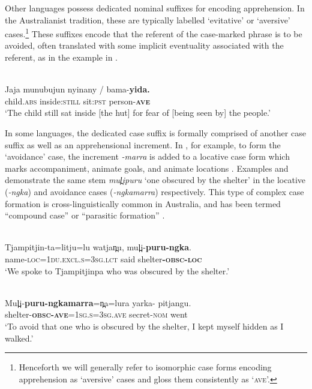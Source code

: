 \documentclass[output=paper,colorlinks,citecolor=brown]{langscibook}
\begin{document}
 Other languages possess dedicated nominal suffixes for encoding apprehension. In the Australianist tradition, these are typically labelled `evitative' or `aversive' cases.\footnote{Henceforth we will generally refer to isomorphic case forms encoding apprehension as `aversive' cases and gloss them consistently as `\textsc{ave}'.} These suffixes encode that the referent of the case-marked phrase is to be avoided, often translated with some implicit eventuality associated with the referent, as in the  example in .

\ea 
{} {\citealt[262]{dixon_grammar_1977}} \\
\gll Jaja munubujun {nyinany \textnormal{/}} bama-\textbf{yida.} \\
child.\textsc{abs} inside:\textsc{still} sit:\textsc{pst} person-\textsc{\textbf{ave}} \\
\glt `The child still sat inside [the hut] for fear of [being seen by] the people.'
\label{ex:bro4}
\z

 In some languages, the dedicated case suffix is formally comprised of another case suffix as well as an apprehensional increment. In , for example, to form the `avoidance' case, the increment \textit{-marra} is added to a locative case form which marks accompaniment, animate goals, and animate locations \citep[57]{hansen_core_1978}. Examples  and  demonstrate the same stem \textit{mul̪ipuru} `one obscured by the shelter' in the locative (\textit{-ngka}) and avoidance cases (\textit{-ngkamarra}) respectively. This type of complex case formation is cross-linguistically common in Australia, and has been termed ``compound case'' \citep[256]{schweiger_compound_2000} or ``parasitic formation'' \citep[85--86]{matthews_morphology_1991}.



\ea
{} {\citealt[99]{hansen_core_1978}} \\
\gll Tjampitjin-ta=litju=lu watja{n̪}u, mul̪i-\textbf{puru-ngka}. \\
name-\textsc{loc=1du.excl.s=3sg.lct} said shelter\textbf{-\textsc{obsc-loc}}\\
\glt `We spoke to Tjampitjinpa who was obscured by the shelter.' 
\label{ex:bro5}
\z


\ea
{} {\citealt[99]{hansen_core_1978}} \\
\gll Mul̪i-\textbf{puru-ngkamarra}=n̪a=lura {yarka-\emptyset} pitjangu. \\
shelter-\textbf{\textsc{obsc-ave}}=\textsc{1sg.s=3sg.ave} secret-\textsc{nom} went \\
\glt `To avoid that one who is obscured by the shelter, I kept myself hidden as I walked.'
\label{ex:bro6}
\z
\end{document}
